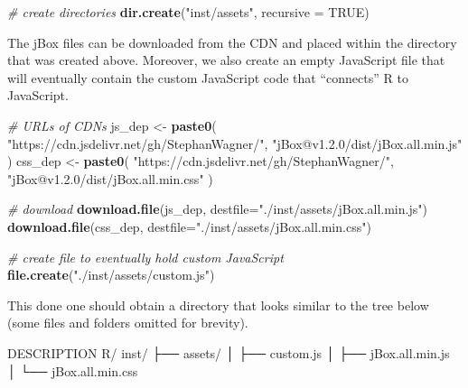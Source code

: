\documentclass[
]{krantz}
\makeatletter
\newenvironment{Shaded}{\begin{snugshade}}{\end{snugshade}}
\newcommand{\CommentTok}[1]{\textcolor[rgb]{0.37,0.37,0.37}{\textit{#1}}}
\newcommand{\DataTypeTok}[1]{\textcolor[rgb]{0.27,0.27,0.27}{#1}}
\newcommand{\ExtensionTok}[1]{#1}
\newcommand{\KeywordTok}[1]{\textcolor[rgb]{0.27,0.27,0.27}{\textbf{#1}}}
\newcommand{\NormalTok}[1]{#1}
\newcommand{\OtherTok}[1]{\textcolor[rgb]{0.37,0.37,0.37}{#1}}
\newcommand{\StringTok}[1]{\textcolor[rgb]{0.5,0.5,0.5}{#1}}
\newenvironment{kframe}{%
\medskip{}
\setlength{\fboxsep}{.8em}
 \def\at@end@of@kframe{}%
 \ifinner\ifhmode%
  \def\at@end@of@kframe{\end{minipage}}%
  \begin{minipage}{\columnwidth}%
 \fi\fi%
 \def\FrameCommand##1{\hskip\@totalleftmargin \hskip-\fboxsep
 \colorbox{shadecolor}{##1}\hskip-\fboxsep
     \hskip-\linewidth \hskip-\@totalleftmargin \hskip\columnwidth}%
 \MakeFramed {\advance\hsize-\width
   \@totalleftmargin\z@ \linewidth\hsize
   \@setminipage}}%
 {\par\unskip\endMakeFramed%
 \at@end@of@kframe}
\renewenvironment{Shaded}{\begin{kframe}}{\end{kframe}}
\makeatother
\begin{document}
\begin{Shaded}
\begin{Highlighting}[]
\CommentTok{\# create directories}
\KeywordTok{dir.create}\NormalTok{(}\StringTok{"inst/assets"}\NormalTok{, }\DataTypeTok{recursive =} \OtherTok{TRUE}\NormalTok{)}
\end{Highlighting}
\end{Shaded}

The jBox files can be downloaded from the CDN and placed within the directory that was created above. Moreover, we also create an empty JavaScript file that will eventually contain the custom JavaScript code that ``connects'' R to JavaScript.

\begin{Shaded}
\begin{Highlighting}[]
\CommentTok{\# URLs of CDNs}
\NormalTok{js\_dep <{-}}\StringTok{ }\KeywordTok{paste0}\NormalTok{(}
  \StringTok{"https://cdn.jsdelivr.net/gh/StephanWagner/"}\NormalTok{,}
  \StringTok{"jBox@v1.2.0/dist/jBox.all.min.js"}
\NormalTok{)}
\NormalTok{css\_dep <{-}}\StringTok{ }\KeywordTok{paste0}\NormalTok{(}
  \StringTok{"https://cdn.jsdelivr.net/gh/StephanWagner/"}\NormalTok{,}
  \StringTok{"jBox@v1.2.0/dist/jBox.all.min.css"}
\NormalTok{)}

\CommentTok{\# download}
\KeywordTok{download.file}\NormalTok{(js\_dep, }\DataTypeTok{destfile=}\StringTok{"./inst/assets/jBox.all.min.js"}\NormalTok{)}
\KeywordTok{download.file}\NormalTok{(css\_dep, }\DataTypeTok{destfile=}\StringTok{"./inst/assets/jBox.all.min.css"}\NormalTok{)}

\CommentTok{\# create file to eventually hold custom JavaScript}
\KeywordTok{file.create}\NormalTok{(}\StringTok{"./inst/assets/custom.js"}\NormalTok{)}
\end{Highlighting}
\end{Shaded}

This done one should obtain a directory that looks similar to the tree below (some files and folders omitted for brevity).

\begin{Shaded}
\begin{Highlighting}[]
\ExtensionTok{DESCRIPTION}
\ExtensionTok{R/}
\ExtensionTok{inst/}
\NormalTok{├── }\ExtensionTok{assets/}
\NormalTok{│    ├── }\ExtensionTok{custom.js}
\NormalTok{│    ├── }\ExtensionTok{jBox.all.min.js}
\NormalTok{│    └── }\ExtensionTok{jBox.all.min.css}
\end{Highlighting}
\end{Shaded}
\end{document}
